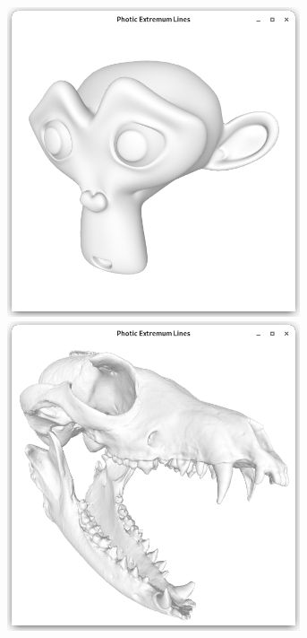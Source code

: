 \documentclass[9pt,fleqn,twoside,twocolumn]{stdglobal}
\begin{document}
\begin{figure}
\begin{subfigure}[t]{0.19\textwidth}
        \includegraphics[width=0.95\textwidth,trim={15px 15 15 50},clip]{images/results/suzanne.png}
        \includegraphics[width=0.95\textwidth,trim={15px 15 15 50},clip]{images/results/skull.png}

\end{subfigure}
\end{figure}
\end{document}
